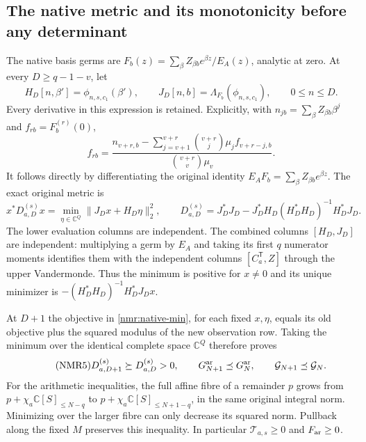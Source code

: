 \subsection{The native metric and its monotonicity before any determinant}
The native basis germs are
$F_b(z)=\sum_\beta Z_{\beta b}e^{\beta z}/E_A(z)$, analytic at zero.
At every $D\geq q-1-v$, let
\[
H_D[n,\beta']=\phi_{n,s,c_1}(\beta'),\qquad
J_D[n,b]=\Lambda_{F_b}(\phi_{n,s,c_1}),
\qquad0\leq n\leq D.
\]
Every derivative in this expression is retained. Explicitly,
with $n_{jb}=\sum_\beta Z_{\beta b}\beta^j$ and $f_{rb}=F_b^{(r)}(0)$,
\[
f_{rb}=
\frac{n_{v+r,b}-\sum_{j=v+1}^{v+r}
             \binom{v+r}{j}\mu_j f_{v+r-j,b}}
     {\binom{v+r}{v}\mu_v}.
\]
It follows directly by differentiating the original identity
$E_AF_b=\sum_\beta Z_{\beta b}e^{\beta z}$.
The exact original metric is
\begin{equation}\tag{NMR4}\label{nmr:native-min}
x^*D_{a,D}^{(s)}x
 =\min_{\eta\in\mathbb C^Q}\|J_Dx+H_D\eta\|_2^2,\qquad
D_{a,D}^{(s)}
 =J_D^*J_D-J_D^*H_D(H_D^*H_D)^{-1}H_D^*J_D .
\end{equation}
The lower evaluation columns are independent. The combined columns
$[H_D,J_D]$ are independent: multiplying a germ by $E_A$ and taking
its first $q$ numerator moments identifies them with the independent
columns $[C_a^{\mathsf T},Z]$ through the upper Vandermonde.
Thus the minimum is positive for $x\ne0$ and its unique minimizer is
$-(H_D^*H_D)^{-1}H_D^*J_Dx$.

At $D+1$ the objective in \eqref{nmr:native-min}, for each fixed
$x,\eta$, equals its old objective plus the squared modulus of the
new observation row. Taking the minimum over the identical complete
space $\mathbb C^Q$ therefore proves
\begin{equation}\tag{NMR5}\label{nmr:monotonicity}
D_{a,D+1}^{(s)}\succeq D_{a,D}^{(s)}>0,\qquad
G_{N+1}^{\rm ar}\preceq G_N^{\rm ar},\qquad
\mathcal G_{N+1}\preceq\mathcal G_N .
\end{equation}
For the arithmetic inequalities, the full affine fibre of a remainder
$p$ grows from $p+\chi_a\mathbb C[S]_{\leq N-q}$ to
$p+\chi_a\mathbb C[S]_{\leq N+1-q}$, in the same original integral
norm. Minimizing over the larger fibre can only decrease its squared
norm. Pullback along the fixed $M$ preserves this inequality.
In particular $\mathcal T_{a,s}\geq0$ and $F_{\rm ar}\geq0$.

